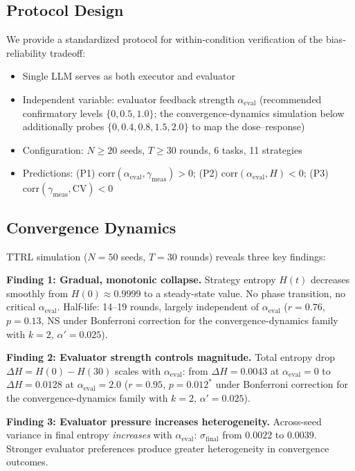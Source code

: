 \documentclass[11pt]{article}
\begin{document}
\subsection{Protocol Design}

We provide a standardized protocol for within-condition verification of the bias-reliability tradeoff:

\begin{itemize}[leftmargin=*,nosep]
 \item Single LLM serves as both executor and evaluator
 \item Independent variable: evaluator feedback strength $\alpha_{\text{eval}}$ (recommended confirmatory levels $\{0, 0.5, 1.0\}$; the convergence-dynamics simulation below additionally probes $\{0, 0.4, 0.8, 1.5, 2.0\}$ to map the dose--response)
 \item Configuration: $N \geq 20$ seeds, $T \geq 30$ rounds, 6 tasks, 11 strategies
 \item Predictions: (P1) $\text{corr}(\alpha_{\text{eval}}, \gamma_{\text{meas}}) > 0$; (P2) $\text{corr}(\alpha_{\text{eval}}, H) < 0$; (P3) $\text{corr}(\gamma_{\text{meas}}, \mathrm{CV}) < 0$
\end{itemize}

\subsection{Convergence Dynamics}

TTRL simulation ($N{=}50$ seeds, $T{=}30$ rounds) reveals three key findings:

\textbf{Finding 1: Gradual, monotonic collapse.} Strategy entropy $H(t)$ decreases smoothly from $H(0) \approx 0.9999$ to a steady-state value. No phase transition, no critical $\alpha_{\text{eval}}$. Half-life: 14--19 rounds, largely independent of $\alpha_{\text{eval}}$ ($r = 0.76$, $p = 0.13$, NS under Bonferroni correction for the convergence-dynamics family with $k = 2$, $\alpha' = 0.025$).

\textbf{Finding 2: Evaluator strength controls magnitude.} Total entropy drop $\Delta H = H(0) - H(30)$ scales with $\alpha_{\text{eval}}$: from $\Delta H = 0.0043$ at $\alpha_{\text{eval}} = 0$ to $\Delta H = 0.0128$ at $\alpha_{\text{eval}} = 2.0$ ($r = 0.95$, $p = 0.012^{*}$ under Bonferroni correction for the convergence-dynamics family with $k = 2$, $\alpha' = 0.025$).

\textbf{Finding 3: Evaluator pressure increases heterogeneity.} Across-seed variance in final entropy \emph{increases} with $\alpha_{\text{eval}}$: $\sigma_{\text{final}}$ from $0.0022$ to $0.0039$. Stronger evaluator preferences produce greater heterogeneity in convergence outcomes.
\end{document}
